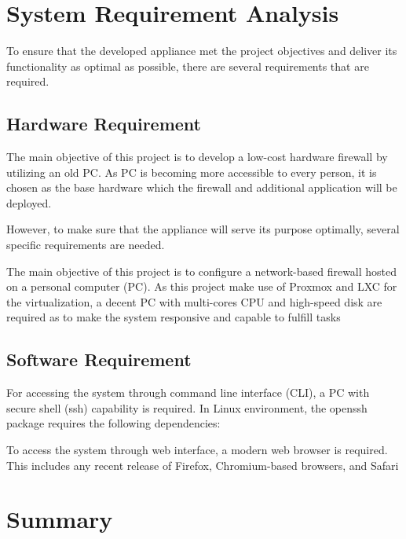 \documentclass[../index.tex]{subfiles}
\begin{document}
\section{System Requirement Analysis}

To ensure that the developed appliance met the project objectives and deliver
its functionality as optimal as possible, there are several requirements that are required.

\subsection{Hardware Requirement}

The main objective of this project is to develop a low-cost hardware firewall
by utilizing an old PC. As PC is becoming more accessible to every person, it is chosen
as the base hardware which the firewall and additional application will be deployed.

However, to make sure that the appliance will serve its purpose optimally, several specific
requirements are needed.

The main objective of this project is to configure a network-based firewall
hosted on a personal computer (PC). As this project make use of Proxmox and LXC
for the virtualization, a decent PC with multi-cores CPU and high-speed disk are
required as to make the system responsive and capable to fulfill tasks

\subsection{Software Requirement}

For accessing the system through command line interface (CLI), a PC with
secure shell (ssh) capability is required. In Linux environment, the openssh package
requires the following dependencies:

To access the system through web interface, a modern web browser is required.
This includes any recent release of Firefox, Chromium-based browsers, and Safari

\section{Summary}
\end{document}
